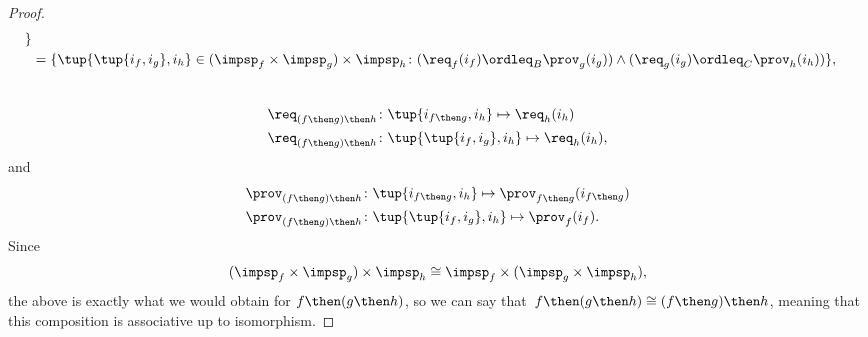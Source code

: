 \begin{proof}
\begin{equation}
\begin{aligned}
            \}                                 \\
             & =\{
            \tup{\tup{i_f, i_g},i_h} \in (\impsp_f \times \impsp_g) \times \impsp_{h}\colon
            (\req_f(i_f) \ordleq_{B} \prov_g(i_g))
            \wedge
            (\req_g(i_g) \ordleq_{C} \prov_h(i_h))
            \},
        \end{aligned}
    \end{equation}
    ~
    \begin{equation}
        \begin{aligned}
            \req_{(f\then g)\then h} & \colon  \tup{i_{f\then g},i_h} \mapsto \req_h(i_h)    \\
            \req_{(f\then g)\then h} & \colon  \tup{\tup{i_f, i_g},i_h} \mapsto \req_h(i_h),
        \end{aligned}
    \end{equation}
    and
    \begin{equation}
        \begin{aligned}
            \prov_{(f\then g)\then h} & \colon  \tup{i_{f\then g},i_h} \mapsto \prov_{f\then g}(i_{f\then g}) \\
            \prov_{(f\then g)\then h} & \colon  \tup{\tup{i_f, i_g},i_h} \mapsto \prov_f(i_f).
        \end{aligned}
    \end{equation}
    Since
    \begin{equation}
        (\impsp_f \times \impsp_g)
        \times \impsp_{h} \cong  \impsp_f \times (\impsp_g \times \impsp_{h}),
    \end{equation}
    the above is exactly what we would obtain for $f\then (g\then h)$, so we can say that~$f\then(g\then h)\cong (f\then g)\then h$, meaning that this composition is associative up to isomorphism.
\end{proof}

